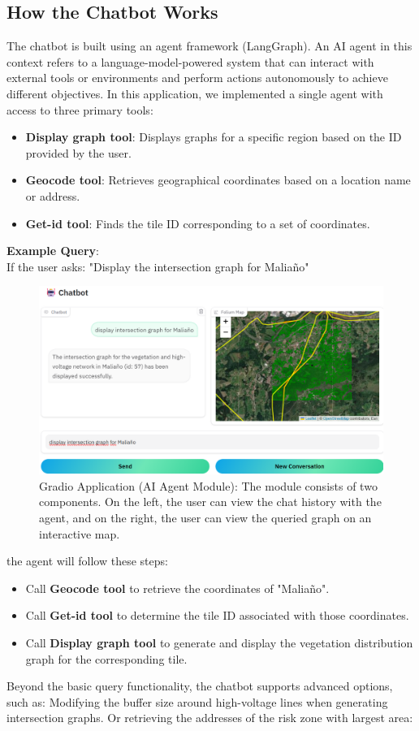 \subsection{How the Chatbot Works}
The chatbot is built using an agent framework (LangGraph). An AI agent in this context refers to a language-model-powered system that can interact with external tools or environments and perform actions autonomously to achieve different objectives. In this application, we implemented a single agent with access to three primary tools:
\begin{itemize}
    \item \textbf{Display graph tool}: Displays graphs for a specific region based on the ID provided by the user.
    \item \textbf{Geocode tool}: Retrieves geographical coordinates based on a location name or address.
    \item \textbf{Get-id tool}: Finds the tile ID corresponding to a set of coordinates.
\end{itemize}
\textbf{Example Query}:\\
If the user asks:
"Display the intersection graph for Maliaño"
\begin{figure}[H]
 \centering
 \includegraphics[scale=0.55]{IMAGENES/Gradio_app_chatbot.png}
 \captionsetup{font=large}
 \caption {Gradio Application (AI Agent Module): The module consists of two components. On the left, the user can view the chat history with the agent, and on the right, the user can view the queried graph on an interactive map.}
\end{figure}



the agent will follow these steps:
\begin{itemize}
    \item Call \textbf{Geocode tool} to retrieve the coordinates of "Maliaño".
    \item Call \textbf{Get-id tool} to determine the tile ID associated with those coordinates.
    \item Call \textbf{Display graph tool} to generate and display the vegetation distribution graph for the corresponding tile.
\end{itemize}
Beyond the basic query functionality, the chatbot supports advanced options, such as: Modifying the buffer size around high-voltage lines when generating intersection graphs. Or retrieving the addresses of the risk zone with largest area:

